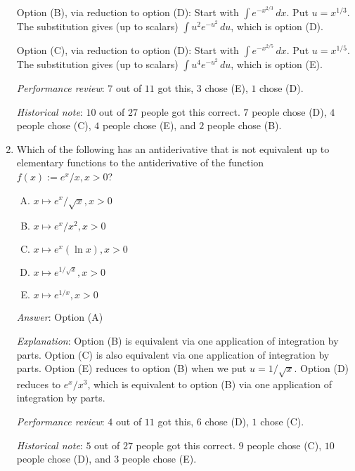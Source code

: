 \documentclass[10pt]{amsart}
\begin{document}
\begin{enumerate}
  Option (B), via reduction to option (D): Start with $\int
  e^{-x^{2/3}} \, dx$. Put $u = x^{1/3}$. The substitution gives (up to
  scalars) $\int u^2e^{-u^2} \, du$, which is option (D).

  Option (C), via reduction to option (D): Start with $\int
  e^{-x^{2/5}} \, dx$. Put $u = x^{1/5}$. The substitution gives (up to
  scalars) $\int u^4e^{-u^2} \, du$, which is option (E).

  {\em Performance review}: $7$ out of $11$ got this, $3$ chose (E),
  $1$ chose (D).

  {\em Historical note}: $10$ out of $27$ people got this
  correct. $7$ people chose (D), $4$ people chose (C), $4$ people
  chose (E), and $2$ people chose (B).

\item Which of the following has an antiderivative that is not
  equivalent up to elementary functions to the antiderivative of the
  function $f(x) := e^x/x, x > 0$?

  \begin{enumerate}[(A)]
  \item $x \mapsto e^x/\sqrt{x}, x > 0$
  \item $x \mapsto e^x/x^2, x > 0$
  \item $x \mapsto e^x(\ln x), x > 0$
  \item $x \mapsto e^{1/\sqrt{x}}, x > 0$
  \item $x \mapsto e^{1/x}, x > 0$
  \end{enumerate}

  {\em Answer}: Option (A)

  {\em Explanation}: Option (B) is equivalent via one application of
  integration by parts. Option (C) is also equivalent via one
  application of integration by parts. Option (E) reduces to option
  (B) when we put $u = 1/\sqrt{x}$. Option (D) reduces to $e^x/x^3$,
  which is equivalent to option (B) via one application of integration
  by parts.

  {\em Performance review}: $4$ out of $11$ got this, $6$ chose (D),
  $1$ chose (C).

  {\em Historical note}: $5$ out of $27$ people got this
  correct. $9$ people chose (C), $10$ people chose (D), and $3$ people
  chose (E).
\end{enumerate}
\end{document}
